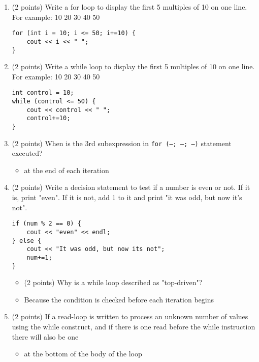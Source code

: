 \documentclass{report}
\begin{document}
\begin{enumerate}
    \item (2 points) Write a for loop to display the first 5 multiples of 10 on one line. For example: 10 20 30 40 50
        \begin{verbatim}
for (int i = 10; i <= 50; i+=10) {
    cout << i << " ";
} 
        \end{verbatim}
        
    
    \item (2 points) Write a while loop to display the first 5 multiples of 10 on one line. For example: 10 20 30 40 50
    \begin{verbatim}
int control = 10;
while (control <= 50) {
    cout << control << " ";
    control+=10;
}
    \end{verbatim}
    
    
    \item (2 points) When is the 3rd subexpression in \texttt{for (--; --; --)} statement executed?
        \begin{itemize}
            \item at the end of each iteration 
        \end{itemize}
    
    \item (2 points) Write a decision statement to test if a number is even or not. If it is, print "even". If it is not, add 1 to it and print "it was odd, but now it's not".
        \begin{verbatim}
if (num % 2 == 0) {
    cout << "even" << endl;
} else {
    cout << "It was odd, but now its not";
    num+=1;
}
        \end{verbatim}
        \begin{itemize}
    
    \item (2 points) Why is a while loop described as "top-driven"?
            \item Because the condition is checked before each iteration begins
        \end{itemize}
    
    \item (2 points) If a read-loop is written to process an unknown number of values using the while construct, and if there is one read before the while instruction there will also be one
    \begin{itemize}
        \item at the bottom of the body of the loop
    \end{itemize}
    \end{enumerate}
\end{document}
